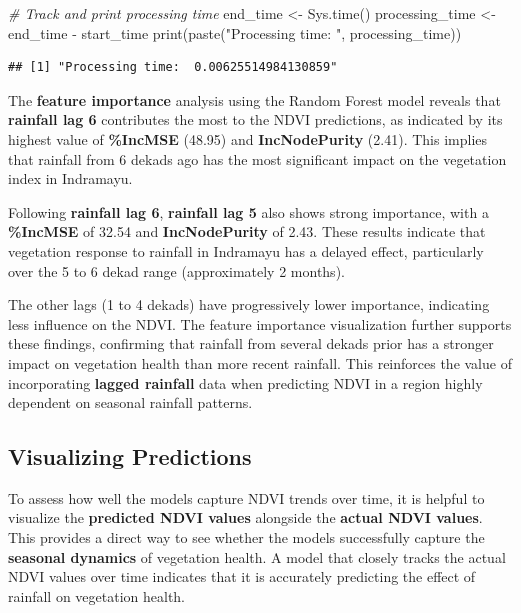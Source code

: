 \documentclass[
]{article}
\newenvironment{Shaded}{}{}
\newcommand{\CommentTok}[1]{\textcolor[rgb]{0.38,0.63,0.69}{\textit{#1}}}
\newcommand{\FunctionTok}[1]{\textcolor[rgb]{0.02,0.16,0.49}{#1}}
\newcommand{\NormalTok}[1]{#1}
\newcommand{\OtherTok}[1]{\textcolor[rgb]{0.00,0.44,0.13}{#1}}
\newcommand{\SpecialCharTok}[1]{\textcolor[rgb]{0.25,0.44,0.63}{#1}}
\newcommand{\StringTok}[1]{\textcolor[rgb]{0.25,0.44,0.63}{#1}}
\begin{document}
\begin{Shaded}
\begin{Highlighting}[]
\CommentTok{\# Track and print processing time}
\NormalTok{end\_time }\OtherTok{\textless{}{-}} \FunctionTok{Sys.time}\NormalTok{()}
\NormalTok{processing\_time }\OtherTok{\textless{}{-}}\NormalTok{ end\_time }\SpecialCharTok{{-}}\NormalTok{ start\_time}
\FunctionTok{print}\NormalTok{(}\FunctionTok{paste}\NormalTok{(}\StringTok{"Processing time: "}\NormalTok{, processing\_time))}
\end{Highlighting}
\end{Shaded}

\begin{verbatim}
## [1] "Processing time:  0.00625514984130859"
\end{verbatim}

The \textbf{feature importance} analysis using the Random Forest model
reveals that \textbf{rainfall lag 6} contributes the most to the NDVI
predictions, as indicated by its highest value of \textbf{\%IncMSE}
(48.95) and \textbf{IncNodePurity} (2.41). This implies that rainfall
from 6 dekads ago has the most significant impact on the vegetation
index in Indramayu.

Following \textbf{rainfall lag 6}, \textbf{rainfall lag 5} also shows
strong importance, with a \textbf{\%IncMSE} of 32.54 and
\textbf{IncNodePurity} of 2.43. These results indicate that vegetation
response to rainfall in Indramayu has a delayed effect, particularly
over the 5 to 6 dekad range (approximately 2 months).

The other lags (1 to 4 dekads) have progressively lower importance,
indicating less influence on the NDVI. The feature importance
visualization further supports these findings, confirming that rainfall
from several dekads prior has a stronger impact on vegetation health
than more recent rainfall. This reinforces the value of incorporating
\textbf{lagged rainfall} data when predicting NDVI in a region highly
dependent on seasonal rainfall patterns.

\subsection{Visualizing Predictions}\label{visualizing-predictions}

To assess how well the models capture NDVI trends over time, it is
helpful to visualize the \textbf{predicted NDVI values} alongside the
\textbf{actual NDVI values}. This provides a direct way to see whether
the models successfully capture the \textbf{seasonal dynamics} of
vegetation health. A model that closely tracks the actual NDVI values
over time indicates that it is accurately predicting the effect of
rainfall on vegetation health.
\end{document}
